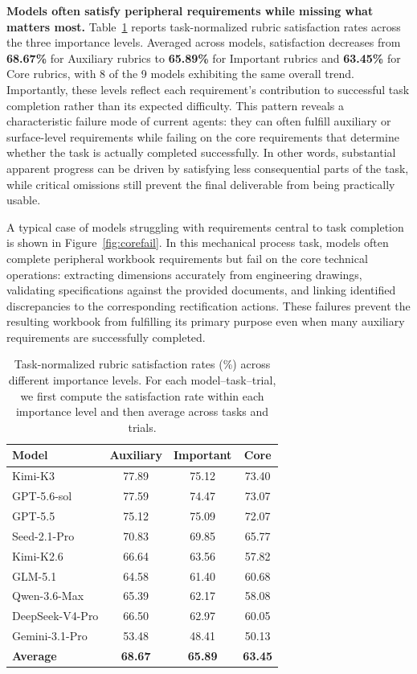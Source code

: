 \textbf{Models often satisfy peripheral requirements while missing what matters most.}
Table~\ref{tab:corefail} reports task-normalized rubric satisfaction rates across the three importance levels. Averaged across models, satisfaction decreases from \textbf{68.67\%} for Auxiliary rubrics to \textbf{65.89\%} for Important rubrics and \textbf{63.45\%} for Core rubrics, with 8 of the 9 models exhibiting the same overall trend. Importantly, these levels reflect each requirement's contribution to successful task completion rather than its expected difficulty. This pattern reveals a characteristic failure mode of current agents: they can often fulfill auxiliary or surface-level requirements while failing on the core requirements that determine whether the task is actually completed successfully. In other words, substantial apparent progress can be driven by satisfying less consequential parts of the task, while critical omissions still prevent the final deliverable from being practically usable.

A typical case of models struggling with requirements central to task completion is shown in Figure~\ref{fig:corefail}. In this mechanical process task, models often complete peripheral workbook requirements but fail on the core technical operations: extracting dimensions accurately from engineering drawings, validating specifications against the provided documents, and linking identified discrepancies to the corresponding rectification actions. These failures prevent the resulting workbook from fulfilling its primary purpose even when many auxiliary requirements are successfully completed.



\begin{table}[t]
\centering
\small
\caption{Task-normalized rubric satisfaction rates (\%) across different importance levels.
For each model--task--trial, we first compute the satisfaction rate within each importance level and then average across tasks and trials.}
\label{tab:corefail}
\begin{tabular}{lccc}
\toprule
\textbf{Model}
& \textbf{Auxiliary }
& \textbf{Important }
& \textbf{Core } \\
\midrule
Kimi-K3          & 77.89 & 75.12 & 73.40 \\
GPT-5.6-sol      & 77.59 & 74.47 & 73.07 \\
GPT-5.5          & 75.12 & 75.09 & 72.07 \\
Seed-2.1-Pro         & 70.83 & 69.85 & 65.77 \\
Kimi-K2.6        & 66.64 & 63.56 & 57.82 \\
GLM-5.1          & 64.58 & 61.40 & 60.68 \\
Qwen-3.6-Max     & 65.39 & 62.17 & 58.08 \\
DeepSeek-V4-Pro  & 66.50 & 62.97 & 60.05 \\
Gemini-3.1-Pro       & 53.48 & 48.41 & 50.13 \\
\midrule
\textbf{Average} & \textbf{68.67} & \textbf{65.89} & \textbf{63.45} \\
\bottomrule
\end{tabular}
\end{table}




